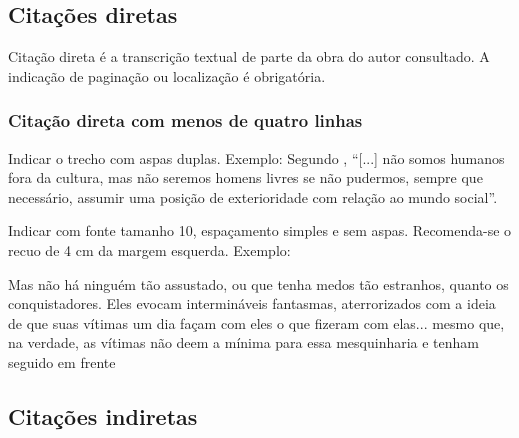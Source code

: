 \documentclass[
  12pt,		%
  a4paper,	%
  openright,  %
  oneside,	%
  chapter=TITLE,		%
  section=TITLE,		%
  english,	%
  french,	    %
  spanish,	%
  brazil	    %
]{abntex2}
\begin{document}
    \subsection{Citações diretas}

        Citação direta é a transcrição textual de parte da obra do autor consultado. A indicação de paginação ou localização é obrigatória.
        
    \subsubsection{Citação direta com menos de quatro linhas}

        Indicar o trecho com aspas duplas. Exemplo:
        Segundo , “[...] não somos humanos fora da cultura, mas não seremos homens livres se não pudermos, sempre que necessário, assumir uma posição de exterioridade com relação ao mundo social”.


        Indicar com fonte tamanho 10, espaçamento simples e sem aspas. Recomenda-se o recuo de 4 cm da margem esquerda. Exemplo:
         \vspace{1.5pt}
            \begin{flushright}
                \begin{minipage}{.724\textwidth}
                    {\SingleSpacing\small

                    Mas não há ninguém tão assustado, ou que tenha medos tão estranhos, quanto os conquistadores. Eles evocam intermináveis fantasmas, aterrorizados com a ideia de que suas vítimas um dia façam com eles o que fizeram com elas... mesmo que, na verdade, as vítimas não deem a mínima para essa mesquinharia e tenham seguido em frente \cite[~ p.253]{Jemisin}
                    }
                \end{minipage}
            \end{flushright}
            \vspace{1.5pt}
        
     
   \subsection{Citações indiretas}	
\end{document}
